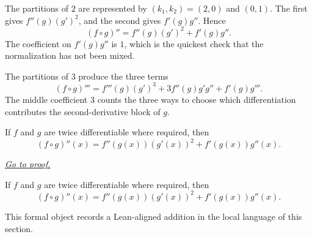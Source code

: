 \begin{exposition}
\label{ex:faa-di-bruno-n2}
The partitions of \(2\) are represented by \((k_1,k_2)=(2,0)\) and
\((0,1)\). The first gives \(f''(g)(g')^2\), and the second gives
\(f'(g)g''\). Hence
\[
  (f\circ g)''
  =
  f''(g)(g')^2+f'(g)g''.
\]
The coefficient on \(f'(g)g''\) is \(1\), which is the quickest check that
the normalization has not been mixed.
\end{exposition}

\begin{exposition}
\label{ex:faa-di-bruno-n3}
The partitions of \(3\) produce the three terms
\[
  (f\circ g)'''
  =
  f'''(g)(g')^3
  +3f''(g)g'g''
  +f'(g)g'''.
\]
The middle coefficient \(3\) counts the three ways to choose which
differentiation contributes the second-derivative block of \(g\).
\end{exposition}

\begin{theorem}
\label{thm:faa-di-bruno-second-order}
If $f$ and $g$ are twice differentiable where required, then
\[
  (f\circ g)''(x)=f''(g(x))(g'(x))^2+f'(g(x))g''(x).
\]

\smallskip
\noindent
\hyperref[prf:faa-di-bruno-second-order]{\textit{Go to proof.}}
\end{theorem}

\begin{remark*}
If $f$ and $g$ are twice differentiable where required, then
\[
  (f\circ g)''(x)=f''(g(x))(g'(x))^2+f'(g(x))g''(x).
\]
\end{remark*}

\begin{remark*}[Interpretation]
This formal object records a Lean-aligned addition in the local language of this section.
\end{remark*}

\begin{dependencies}
\NoLocalDependencies
\end{dependencies}
